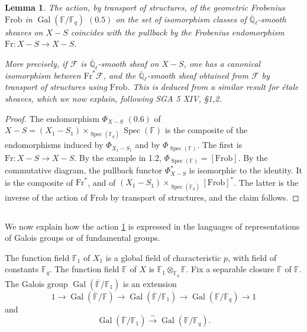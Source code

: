 \documentclass[11pt,a4paper]{article}
\theoremstyle{plain}
\newtheorem{lemma}[theorem]{Lemma}
\theoremstyle{definition}
\DeclareMathOperator{\Spec}{Spec}
\DeclareMathOperator{\Gal}{Gal}
\newcommand{\Ql}{\overline{\mathbb{Q}}_\ell}
\newcommand{\Fq}{\mathbb{F}_q}
\newcommand{\F}{\mathbb{F}}
\newcommand{\Frob}{\mathrm{Frob}}
\newcommand{\Fr}{\mathrm{Fr}}
\begin{document}
\begin{lemma}\label{lem:frob}
The action, by transport of structures, of the geometric Frobenius $\Frob$ in $\Gal(\F/\Fq)$ $(0.5)$ on the set of isomorphism classes of $\Ql$-smooth sheaves on $X - S$ coincides with the pullback by the Frobenius endomorphism $\Fr: X - S \to X - S$.

More precisely, if $\mathcal{F}$ is $\Ql$-smooth sheaf on $X - S$, one has a canonical isomorphism between $\Fr^*\mathcal{F}$, and the $\Ql$-smooth sheaf obtained from $\mathcal{F}$ by transport of structures using $\Frob$. This is deduced from a similar result for \'etale sheaves, which we now explain, following SGA 5 XIV, \S 1,2.
\end{lemma}

\begin{proof}
The endomorphism $\Phi_{X-S}$ $(0.6)$ of $X - S = (X_1 - S_1) \times_{\Spec(\Fq)} \Spec(\F)$ is the composite of the endomorphisms induced by $\Phi_{X_1-S_1}$ and by $\Phi_{\Spec(\F)}$. The first is $\Fr: X - S \to X - S$. By the example in 1.2, $\Phi_{\Spec(\F)} = [\Frob]$. By the commutative diagram, the pullback functor $\Phi_{X-S}^*$ is isomorphic to the identity. It is the composite of $\Fr^*$, and of $(X_1 - S_1) \times_{\Spec(\Fq)} [\Frob]^*$. The latter is the inverse of the action of $\Frob$ by transport of structures, and the claim follows.
\end{proof}

\subsection{}

We now explain how the action \ref{lem:frob} is expressed in the languages of representations of Galois groups or of fundamental groups.

The function field $\mathbb{F}_1$ of $X_1$ is a global field of characteristic $p$, with field of constants $\Fq$. The function field $\mathbb{F}$ of $X$ is $\mathbb{F}_1 \otimes_{\Fq} \F$. Fix a separable closure $\overline{\mathbb{F}}$ of $\mathbb{F}$. The Galois group $\Gal(\overline{\mathbb{F}}/\mathbb{F}_1)$ is an extension
\begin{equation}
1 \to \Gal(\overline{\mathbb{F}}/\mathbb{F}) \to \Gal(\overline{\mathbb{F}}/\mathbb{F}_1) \to \Gal(\F/\Fq) \to 1
\end{equation}
and
\begin{equation}
\Gal(\overline{\mathbb{F}}/\mathbb{F}_1) \xrightarrow{\sim} \Gal(\F/\Fq).
\end{equation}
\end{document}

